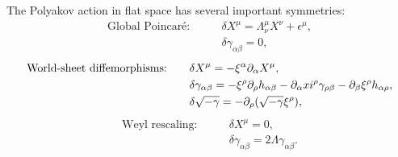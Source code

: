 The Polyakov action in flat space has several important symmetries: 
\begin{align}
    \text{Global Poincaré:}\qquad &\delta X^\mu = \Lambda^\mu_\nu X^\nu+\epsilon^\mu,\\
    &\delta \gamma_{\alpha\beta} = 0,
\end{align}
\begin{align}
    \text{World-sheet diffemorphisms:}\qquad &\delta X^\mu = -\xi^\alpha\partial_\alpha X^\mu,\\
    &\delta \gamma_{\alpha\beta} = -\xi^\rho\partial_\rho h_{\alpha\beta}-\partial_\alpha xi^\rho \gamma_{\rho\beta}-\partial_\beta \xi^\rho h_{\alpha\rho},\\
    &\delta\sqrt{-\gamma} = -\partial_\rho(\sqrt{-\gamma}\xi^\rho),
\end{align}
\begin{align}
    \text{Weyl rescaling:}\qquad &\delta X^\mu = 0,\\
    & \delta \gamma_{\alpha\beta} = 2\Lambda \gamma_{\alpha\beta}.
\end{align}

